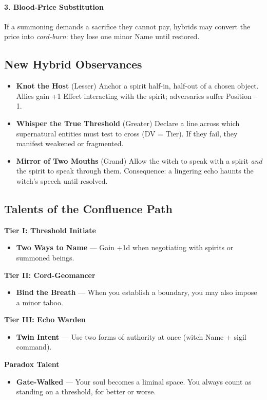 \documentclass[11pt]{book}
\begin{document}
\paragraph{3. Blood-Price Substitution}  
If a summoning demands a sacrifice they cannot pay, hybrids may convert the price into  
\emph{cord-burn}: they lose one minor Name until restored.

\subsection*{New Hybrid Observances}
\begin{itemize}[leftmargin=1.5em]
    \item \textbf{Knot the Host} (Lesser)  
    Anchor a spirit half-in, half-out of a chosen object.  
    Allies gain +1 Effect interacting with the spirit; adversaries suffer Position --1.

    \item \textbf{Whisper the True Threshold} (Greater)  
    Declare a line across which supernatural entities must test to cross (DV = Tier).  
    If they fail, they manifest weakened or fragmented.

    \item \textbf{Mirror of Two Mouths} (Grand)  
    Allow the witch to speak with a spirit \emph{and} the spirit to speak through them.  
    Consequence: a lingering echo haunts the witch's speech until resolved.
\end{itemize}

\subsection*{Talents of the Confluence Path}
\begin{tcolorbox}[colback=shadowgray!8,colframe=shadowgray!60,title={Confluence-Binder Talents}]
\textbf{Tier I: Threshold Initiate}
\begin{itemize}[noitemsep]
    \item \textbf{Two Ways to Name} --- Gain +1d when negotiating with spirits or summoned beings.
\end{itemize}

\textbf{Tier II: Cord-Geomancer}
\begin{itemize}[noitemsep]
    \item \textbf{Bind the Breath} --- When you establish a boundary, you may also impose a minor taboo.
\end{itemize}

\textbf{Tier III: Echo Warden}
\begin{itemize}[noitemsep]
    \item \textbf{Twin Intent} --- Use two forms of authority at once (witch Name + sigil command).
\end{itemize}

\textbf{Paradox Talent}
\begin{itemize}[noitemsep]
    \item \textbf{Gate-Walked} --- Your soul becomes a liminal space.  
    You always count as standing on a threshold, for better or worse.
\end{itemize}
\end{tcolorbox}
\end{document}
